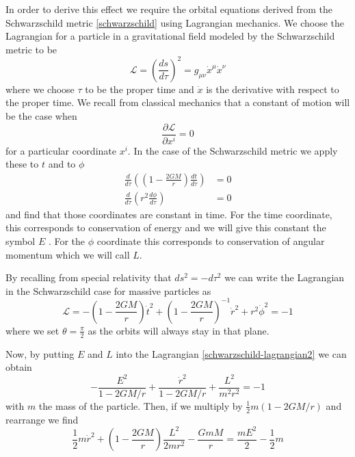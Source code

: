 In order to derive this effect we require the orbital equations derived from the Schwarzschild metric \eqref{schwarzschild} using Lagrangian mechanics. We choose the Lagrangian for a particle in a gravitational field modeled by the Schwarzschild metric to be \cite{cheng}
\begin{equation} \label{schwarzschild-lagrangian}
	\mathcal{L} = \left(\frac{ds}{d\tau}\right)^2 = g_{\mu \nu} \dot{x}^{\mu} \dot{x}^{\nu}
\end{equation}
where we choose \(\tau\) to be the proper time and \(\dot{x}\) is the derivative with respect to the proper time. We recall from classical mechanics that a constant of motion will be the case when \cite{mech}
\begin{equation} \label{lagrangian-constant}
	\frac{\partial \mathcal{L}}{\partial x^{i}} = 0
\end{equation}
for a particular coordinate \(x^{i}\). In the case of the Schwarzschild metric we apply these to \(t\) and to \(\phi\) \cite{hartle}
\begin{equation} \label{conservation}
	\begin{aligned}
		\frac{d}{d \tau} \left(\left(1 - \frac{2 G M}{r}\right) \frac{dt}{d \tau}\right) &= 0 \\
		\frac{d}{d \tau} \left(r^2 \frac{d \phi}{d \tau}\right) &= 0
	\end{aligned}
\end{equation}
and find that those coordinates are constant in time. For the time coordinate, this corresponds to conservation of energy and we will give this constant the symbol \(E\) \cite{hartle, carroll}. For the \(\phi\) coordinate this corresponds to conservation of angular momentum \cite{hartle} which we will call \(L\). 

By recalling from special relativity that \(ds^2 = - d \tau^2\) we can write the Lagrangian in the Schwarzschild case for massive particles as \cite{cheng}
\begin{equation} \label{schwarzschild-lagrangian2}
	\mathcal{L} = - \left( 1 - \frac{2 G M}{r}\right) \dot{t}^2 + \left(1 - \frac{2 G M}{r} \right)^{-1} \dot{r}^2 + r^2 \dot{\phi}^2 = -1
\end{equation}
where we set \(\theta = \frac{\pi}{2}\) as the orbits will always stay in that plane.

Now, by putting \(E\) and \(L\) into the Lagrangian \eqref{schwarzschild-lagrangian2} we can obtain
\begin{equation} \label{energy-balence}
	- \frac{E^2}{1 - 2GM/r} + \frac{\dot{r}^2}{1 - 2GM/r} + \frac{L^2}{m^2 r^2} = -1
\end{equation}
with \(m\) the mass of the particle. Then, if we multiply by \(\frac{1}{2} m (1 - 2GM/r)\) and rearrange we find
\begin{equation} \label{energy-balence2}
	\frac{1}{2} m \dot{r}^2 + \left( 1 - \frac{2GM}{r}\right) \frac{L^2}{2mr^2} - \frac{GmM}{r} = \frac{m E^2}{2} - \frac{1}{2} m
\end{equation}

